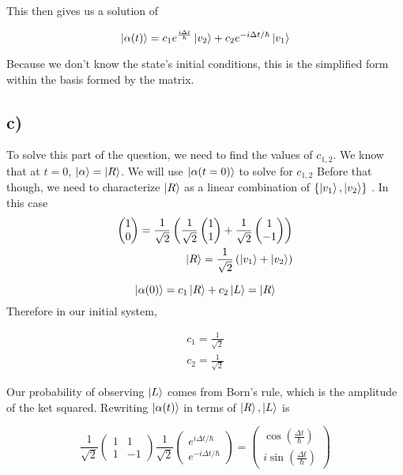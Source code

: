 \documentclass[]{article}
\begin{document}
This then gives us a solution of

\[
\ket{\alpha(t)} =c_{1} e^{\frac{i \Delta t}{\hbar}}\ket{v_{2}} +c_{2}e^{ -i\Delta t/\hbar }\ket{v_{1}} 
\]

Because we don't know the state's initial conditions, this is the
simplified form within the basis formed by the matrix.

\hypertarget{c}{%
\subsection{c)}\label{c}}

To solve this part of the question, we need to find the values of
\(c_{1,2}\). We know that at \(t=0\), \(\ket{\alpha}=\ket{R}\). We will
use \(\ket{\alpha(t=0)}\) to solve for \(c_{1,2}\) Before that though,
we need to characterize \(\ket{R}\) as a linear combination of
\(\left\{ \ket{v_{1}},\ket{v_{2}} \right\}\) . In this case \[
\begin{align} 
\begin{pmatrix}
1 \\
0 
\end{pmatrix} = \frac{1}{\sqrt{ 2 }}\left( \frac{1}{\sqrt{ 2 }}\begin{pmatrix}
1 \\
1
\end{pmatrix} +\frac{1}{\sqrt{ 2 }}\begin{pmatrix}
1 \\
-1
\end{pmatrix}\right) \\
\ket{R}  = \frac{1}{\sqrt{ 2 }} \left( \ket{v_{1}} +\ket{v_{2}}  \right) 
\end{align}
\]

\[
\ket{\alpha(0)} =c_{1}\ket{R} +c_{2}\ket{L}  = \ket{R} 
\] Therefore in our initial system,

\[
\begin{align}
c_{1} = \frac{1}{\sqrt{ 2 }} \\
c_{2}=\frac{1}{\sqrt{ 2 }}
\end{align}
\]

Our probability of observing \(\ket{L}\) comes from Born's rule, which
is the amplitude of the ket squared. Rewriting \(\ket{\alpha(t)}\) in
terms of \(\ket{R},\ket{L}\) is

\[\frac{1}{\sqrt{ 2 }}
\begin{pmatrix}
1 & 1 \\
1 & -1
\end{pmatrix} \frac{1}{\sqrt{2}}\begin{pmatrix}
e^{ i\Delta  t/\hbar } \\
e^{ -i\Delta t/\hbar }
\end{pmatrix}=\begin{pmatrix}\cos{\left(\frac{ \Delta t}{ \hbar} \right)}\\i \sin{\left(\frac{ \Delta t}{ \hbar} \right)}\end{pmatrix}
\]
\end{document}

